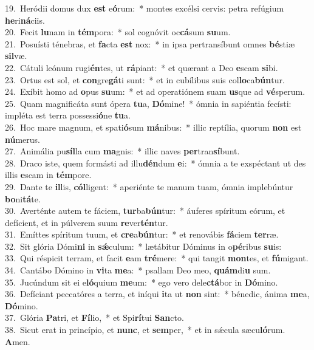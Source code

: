 {19.~}Heródii domus dux \textbf{est} e\textbf{ó}rum:~* montes excélsi cervis: petra refúgium \textbf{he}ri\textbf{ná}ciis.\\
{20.~}Fecit \textbf{lu}nam in \textbf{tém}pora:~* sol cognóvit oc\textbf{cá}sum \textbf{su}um.\\
{21.~}Posuísti ténebras, et \textbf{fa}cta \textbf{est} nox:~* in ipsa pertransíbunt omnes \textbf{bé}stiæ \textbf{sil}væ.\\
{22.~}Cátuli leónum rugi\textbf{én}tes, ut \textbf{rá}piant:~* et quærant a Deo \textbf{e}scam \textbf{si}bi.\\
{23.~}Ortus est sol, et \textbf{con}gre\textbf{gá}ti sunt:~* et in cubílibus suis col\textbf{lo}ca\textbf{bún}tur.\\
{24.~}Exíbit homo ad \textbf{o}pus \textbf{su}um:~* et ad operatiónem suam \textbf{us}que ad \textbf{vé}sperum.\\
{25.~}Quam magnificáta sunt ópera \textbf{tu}a, \textbf{Dó}mine!~* ómnia in sapiéntia fecísti: impléta est terra possessi\textbf{ó}ne \textbf{tu}a.\\
{26.~}Hoc mare magnum, et spati\textbf{ó}sum \textbf{má}nibus:~* illic reptília, quorum \textbf{non} est \textbf{nú}merus.\\
{27.~}Animália pu\textbf{síl}la cum \textbf{ma}gnis:~* illic naves \textbf{per}tran\textbf{sí}bunt.\\
{28.~}Draco iste, quem formásti ad illu\textbf{dén}dum \textbf{e}i:~* ómnia a te exspéctant ut des illis \textbf{e}scam in \textbf{tém}pore.\\
{29.~}Dante te \textbf{il}lis, \textbf{cól}ligent:~* aperiénte te manum tuam, ómnia implebúntur \textbf{bo}ni\textbf{tá}te.\\
{30.~}Averténte autem te fáciem, \textbf{tur}ba\textbf{bún}tur:~* áuferes spíritum eórum, et defícient, et in púlverem suum \textbf{re}ver\textbf{tén}tur.\\
{31.~}Emíttes spíritum tuum, et \textbf{cre}a\textbf{bún}tur:~* et renovábis \textbf{fá}ciem \textbf{ter}ræ.\\
{32.~}Sit glória Dómi\textbf{ni} in \textbf{sǽ}culum:~* lætábitur Dóminus in o\textbf{pé}ribus \textbf{su}is:\\
{33.~}Qui réspicit terram, et facit \textbf{e}am \textbf{tré}mere:~* qui tangit \textbf{mon}tes, et \textbf{fú}migant.\\
{34.~}Cantábo Dómino in \textbf{vi}ta \textbf{me}a:~* psallam Deo meo, \textbf{quám}di\textbf{u} sum.\\
{35.~}Jucúndum sit ei e\textbf{ló}quium \textbf{me}um:~* ego vero dele\textbf{ctá}bor in \textbf{Dó}mino.\\
{36.~}Defíciant peccatóres a terra, et iníqui \textbf{i}ta ut \textbf{non} sint:~* bénedic, ánima \textbf{me}a, \textbf{Dó}mino.\\
{37.~}Glória \textbf{Pa}tri, et \textbf{Fí}lio,~* et Spi\textbf{rí}tui \textbf{San}cto.\\
{38.~}Sicut erat in princípio, et \textbf{nunc}, et \textbf{sem}per,~* et in sǽcula sæcu\textbf{ló}rum. \textbf{A}men.\\

